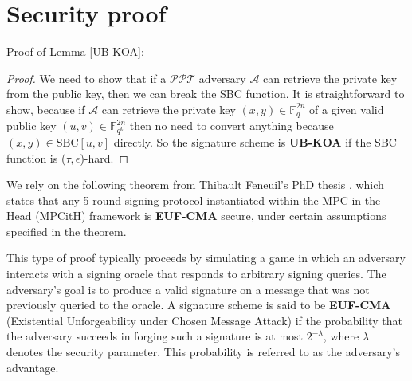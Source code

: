 \documentclass[english]{article}
\begin{document}
\section{Security proof}\label{appendix:proof}
	Proof of Lemma \ref{UB-KOA}:
	\begin{proof}
		We need to show that if a $\mathcal{PPT}$ adversary $\mathcal{A}$ can retrieve the private key from the public key, then we can break the SBC function.
		It is straightforward to show, because if $\mathcal{A}$ can retrieve the private key $(x, y) \in \mathbb{F}_{q}^{2n}$ of a given valid public key $(u, v) \in \mathbb{F}_{q^k}^{2n}$ then no need to convert anything because $(x, y) \in \text{SBC}[u, v]$ directly. So the signature scheme is \textbf{UB-KOA} if the SBC function is ($\tau, \epsilon$)-hard.
	\end{proof}
	
	We rely on the following theorem from Thibault Feneuil's PhD thesis \cite{feneu2023}, which states that any 5-round signing protocol instantiated within the MPC-in-the-Head (MPCitH) framework is \textbf{EUF-CMA} secure, under certain assumptions specified in the theorem.
	
	This type of proof typically proceeds by simulating a game in which an adversary interacts with a signing oracle that responds to arbitrary signing queries. The adversary's goal is to produce a valid signature on a message that was not previously queried to the oracle. A signature scheme is said to be \textbf{EUF-CMA} (Existential Unforgeability under Chosen Message Attack) if the probability that the adversary succeeds in forging such a signature is at most $2^{-\lambda}$, where $\lambda$ denotes the security parameter. This probability is referred to as the adversary's advantage.
	
\end{document}
